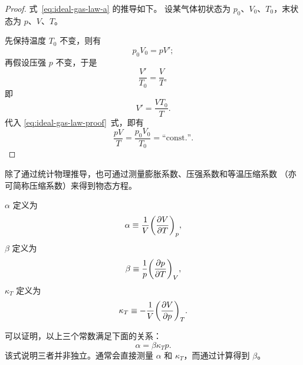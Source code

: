 \begin{proof}
  式~\eqref{eq:ideal-gas-law-a} 的推导如下。
  设某气体初状态为 $p_0$、$V_0$、$T_0$，末状态为 $p$、$V$、$T$。

  先保持温度 $T_0$ 不变，则有
  \begin{equation} \label{eq:ideal-gas-law-proof}
    p_0 V_0 = p V';
  \end{equation}
  再假设压强 $p$ 不变，于是
  \begin{equation}
    \frac{V'}{T_0} = \frac{V}{T},
  \end{equation}
  即
  \begin{equation}
    V' = \frac{V T_0}{T}.
  \end{equation}
  代入 \eqref{eq:ideal-gas-law-proof}~式，即有
  \begin{equation}
    \frac{p V}{T} = \frac{p_0 V_0}{T_0} = \text{``const.''}.
  \end{equation}
\end{proof}

除了通过统计物理推导，也可通过测量膨胀系数、压强系数和等温压缩系数
（亦可简称压缩系数）来得到物态方程。

 $\alpha$ 定义为
\begin{equation}
  \alpha \equiv \frac{1}{V} \qty(\pdv{V}{T})_p,
\end{equation}
 $\beta$ 定义为
\begin{equation}
  \beta \equiv \frac{1}{p} \qty(\pdv{p}{T})_V,
\end{equation}
 $\kappa_T$ 定义为
\begin{equation}
  \kappa_T \equiv -\frac{1}{V} \qty(\pdv{V}{p})_T.
\end{equation}

可以证明，以上三个常数满足下面的关系：
\begin{equation} \label{eq:relation-of-alpha-beta-gamma}
  \alpha = \beta \kappa_T p.
\end{equation}
该式说明三者并非独立。通常会直接测量 $\alpha$ 和 $\kappa_T$，而通过计算得到
$\beta$。

